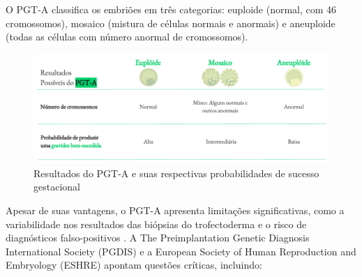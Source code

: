 O PGT-A classifica os embriões em três categorias: euploide (normal, com 46 cromossomos), mosaico (mistura de células normais e anormais) e aneuploide (todas as células com número anormal de cromossomos). 

\begin{center}
    \begin{figure}[h]
        \captionsetup{font=footnotesize, position=above}
        \label{fig:ResultadosPGT}
        \centering
        \includegraphics[scale=0.5]{figuras/ResultadosPGT.pdf}
        \vspace{0.3cm} 
        \caption{Resultados do PGT-A e suas respectivas probabilidades de sucesso gestacional}
    \end{figure}
\end{center}
\FloatBarrier

Apesar de suas vantagens, o PGT-A apresenta limitações significativas, como a variabilidade nos resultados das biópsias do trofectoderma e o risco de diagnósticos falso-positivos \cite{gleicher2021}. A The Preimplantation Genetic Diagnosis International Society (PGDIS) e a European Society of Human Reproduction and Embryology (ESHRE) apontam questões críticas, incluindo:

